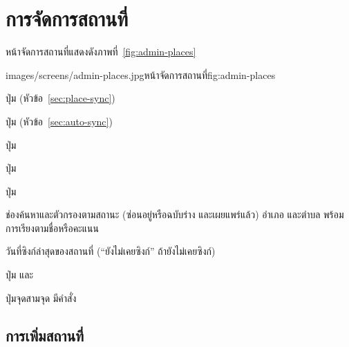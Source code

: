 \label{ch:admin-web}

\section{การจัดการสถานที่}
\label{sec:admin-places}

หน้าจัดการสถานที่แสดงดังภาพที่~\ref{fig:admin-places}

\begin{screenshot}[width=\linewidth]{images/screens/admin-places.jpg}{หน้าจัดการสถานที่}{fig:admin-places}
\end{screenshot}

\begin{calloutlist}
  \item ปุ่ม  (หัวข้อ~\ref{sec:place-sync})
  \item ปุ่ม  (หัวข้อ~\ref{sec:auto-sync})
  \item ปุ่ม 
  \item ปุ่ม 
  \item ปุ่ม 
  \item ช่องค้นหาและตัวกรองตามสถานะ (ซ่อนอยู่หรือฉบับร่าง และเผยแพร่แล้ว) อำเภอ และตำบล พร้อมการเรียงตามชื่อหรือคะแนน
  \item วันที่ซิงก์ล่าสุดของสถานที่ (``ยังไม่เคยซิงก์'' ถ้ายังไม่เคยซิงก์)
  \item ปุ่ม   และ 
  \item ปุ่มจุดสามจุด มีคำสั่ง 
\end{calloutlist}

\subsection{การเพิ่มสถานที่}

